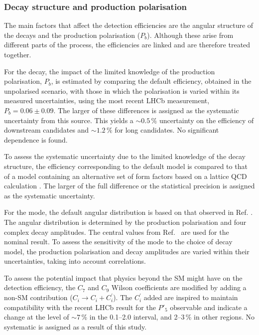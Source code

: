 \subsubsection{Decay structure and production polarisation}
 The main factors that affect the detection efficiencies are the
 angular structure of the decays and the production polarisation
 ($P_b$). Although these arise from different parts of the process,
 the efficiencies are linked and are therefore treated together.

 For the \decay{\Lb}{\Lz\mumu} decay, the impact of the limited
 knowledge of the production polarisation, $P_b$, is estimated by
 comparing the default efficiency, obtained in the unpolarised
 scenario, with those in which the polarisation is varied within its
 measured uncertainties, using the most recent LHCb measurement, $P_b
 = 0.06 \pm 0.09$\cite{LHCb-PAPER-2012-057}.  The larger of these
 differences is assigned as the systematic uncertainty from this
 source. This yields a $\sim 0.5\,\%$ uncertainty on the efficiency of
 downstream candidates and $\sim 1.2\,\%$ for long candidates.  No
 significant \qsq dependence is found.

 To assess the systematic uncertainty due to the limited knowledge of
 the decay structure, the efficiency corresponding to the default
 model \cite{Gutsche:2013pp,Aliev:2005np,Buras:1994dj} is compared to
 that of a model containing an alternative set of form factors based
 on a lattice QCD calculation \cite{Detmold:2012vy}. The larger of the
 full difference or the statistical precision is assigned as the
 systematic uncertainty.
 
 For the \decay{\Lb}{\jpsi\Lz} mode, the default angular distribution
 is based on that observed in Ref.  \cite{LHCb-PAPER-2012-057}. The
 angular distribution is determined by the production polarisation and
 four complex decay amplitudes. The central values from
 Ref.~\cite{LHCb-PAPER-2012-057} are used for the nominal result. To
 assess the sensitivity of the \decay{\Lb}{\jpsi\Lz} mode to the
 choice of decay model, the production polarisation and decay
 amplitudes are varied within their uncertainties, taking into account
 correlations.

 To assess the potential impact that physics beyond the SM might have
 on the detection efficiency, the $C_7$ and $C_9$ Wilson coefficients
 are modified by adding a non-SM contribution ($C_i \rightarrow C_i +
 C_i^{'}$). The $C_i^{'}$ added are inspired to maintain compatibility
 with the recent LHCb result for the $P'_5$ observable
 \cite{Descotes-Genon:2013wba} and indicate a change at the level of
 $\sim 7$\,\% in the 0.1--2.0 \qsq interval, and 2--3\,\% in other
 regions.  No systematic is assigned as a result of this study.

